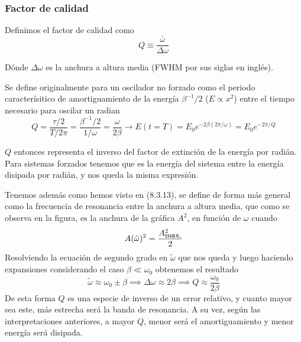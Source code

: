 \subsubsection{Factor de calidad}
Definimos el factor de calidad como
\begin{equation} \label{6.1.1}
    Q \equiv  \frac{\bar{\omega}}{\Delta \omega}
\end{equation}

\vspace{-15pt}
Dónde $\Delta \omega$ es la anchura a altura media (FWHM por sus siglas en inglés).

Se define originalmente para un oscilador no forzado como el periodo caracterísitico de amortiguamiento de la energía $\beta^{-1}/2$ ($E \propto x^2$) entre el tiempo necesario para oscilar un radian
\begin{equation} \label{6.1.1}
    Q = \frac{\tau / 2}{T/ 2\pi} = \frac{\beta^{-1}/2}{1/\omega} = \frac{\omega}{2\beta} \rightarrow E (t = T) = E_0 e^{-2 \beta (2\pi/\omega)} = E_0 e^{-2\pi/Q}
\end{equation}
$Q$ entonces representa el inverso del factor de extinción de la energía \newline por radián. Para sistemas forzados tenemos que es la energía del sistema \newline entre  la energía disipada por radián, y nos queda la misma expresión.

Tenemos además como hemos visto en (8.3.13), se define de forma más general \newline como la frecuencia de resonancia entre la anchura a altura media, que como se observa en la figura, es la anchura de la gráfica $A^2$, en función de $\omega$ cuando 
\begin{equation} \label{6.1.1}
    A(\tilde{\omega})^2 = \frac{A^2_{\mbox{\small max.}}}{2}
\end{equation}
Resolviendo la ecuación de segundo grado en $\tilde{\omega}$ que nos queda y luego haciendo expansiones considerando el caso $\beta \ll \omega_0$ obtenemos el resultado
\begin{equation} \label{6.1.1}
    \tilde{\omega} \approx \omega_0 \pm \beta \implies \Delta \omega \approx 2\beta \implies Q \approx \frac{\omega_0}{2\beta}
\end{equation}
De esta forma $Q$ es una especie de inverso de un error relativo, y cuanto mayor sea este, más estrecha será la banda de resonancia. A su vez, según las interpretaciones anteriores, a mayor $Q$, menor será el amortiguamiento y menor energía será disipada.
\vspace{-15pt}
